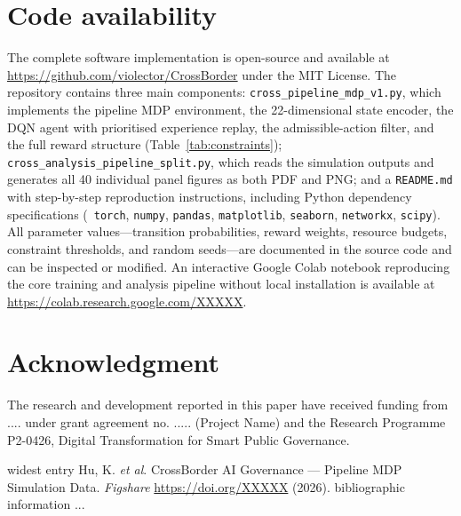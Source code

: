 \documentclass{article}
\begin{document}
\section{Code availability}
The complete software implementation is open-source and available at \url{https://github.com/violector/CrossBorder} under the MIT License. The repository contains three main components: \texttt{cross\_pipeline\_mdp\_v1.py}, which implements the pipeline MDP environment, the 22-dimensional state encoder, the DQN agent with prioritised experience replay, the admissible-action filter, and the full reward structure (Table~\ref{tab:constraints}); \texttt{cross\_analysis\_pipeline\_split.py}, which reads the simulation outputs and generates all 40 individual panel figures as both PDF and PNG; and a \texttt{README.md} with step-by-step reproduction instructions, including Python dependency specifications (~\texttt{torch}, \texttt{numpy}, \texttt{pandas}, \texttt{matplotlib}, \texttt{seaborn}, \texttt{networkx}, \texttt{scipy}). All parameter values---transition probabilities, reward weights, resource budgets, constraint thresholds, and random seeds---are documented in the source code and can be inspected or modified. An interactive Google Colab notebook reproducing the core training and analysis pipeline without local installation is available at \url{https://colab.research.google.com/XXXXX}.

\section*{Acknowledgment}
The research and development reported in this paper have received funding from .... under grant agreement no. ..... (Project Name) and the Research Programme P2-0426, Digital Transformation for Smart Public Governance.



\begin{thebibliography}{widest entry}
  Hu, K. \textit{et al}. CrossBorder AI Governance --- Pipeline MDP Simulation Data. \textit{Figshare} \url{https://doi.org/XXXXX} (2026).
  bibliographic information
 ...
\end{thebibliography}
\end{document}
